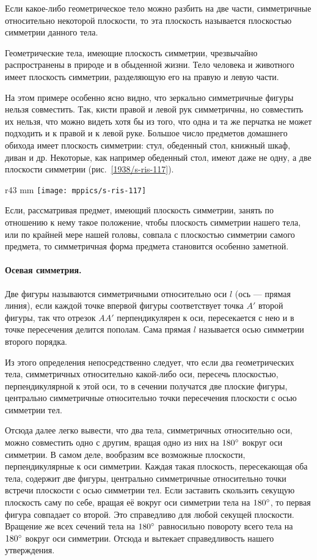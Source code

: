 Если какое-либо геометрическое тело можно разбить на две части, симметричные относительно некоторой плоскости, то эта плоскость называется плоскостью симметрии данного тела.

Геометрические тела, имеющие плоскость симметрии, чрезвычайно распространены в природе и в обыденной жизни.
Тело человека и животного имеет плоскость симметрии, разделяющую его на правую и левую части.

На этом примере особенно ясно видно, что зеркально симметричные фигуры нельзя совместить.
Так, кисти правой и левой рук симметричны, но совместить их нельзя, что можно видеть хотя бы из того, что одна и та же перчатка не может подходить и к правой и к левой руке.
Большое число предметов домашнего обихода имеет плоскость симметрии: стул, обеденный стол, книжный шкаф, диван и др.
Некоторые, как например обеденный стол, имеют даже не одну, а две плоскости симметрии (рис.~\ref{1938/s-ris-117}).

\begin{wrapfigure}{r}{43 mm}
\vskip-4mm
\centering
\texttt{[image: mppics/s-ris-117]}
\caption{}\label{1938/s-ris-117}
\vskip-0mm
\end{wrapfigure}

Если, рассматривая предмет, имеющий плоскость симметрии, занять по отношению к нему такое положение, чтобы плоскость симметрии нашего тела, или по крайней мере нашей головы, совпала с плоскостью симметрии самого предмета, то симметричная форма предмета становится особенно заметной.

\paragraph{Осевая симметрия.}\label{1938/s101}
Две фигуры называются симметричными относительно оси $l$ (ось — прямая линия), если каждой точке впервой фигуры соответствует точка $A'$ второй фигуры, так что отрезок $AA'$ перпендикулярен к оси, пересекается с нею и в точке пересечения делится пополам.
Сама прямая $l$ называется осью симметрии второго порядка.

Из этого определения непосредственно следует, что если два геометрических тела, симметричных относительно какой-либо оси, пересечь плоскостью, перпендикулярной к этой оси, то в сечении получатся две плоские фигуры, центрально симметричные относительно точки пересечения плоскости с осью симметрии тел.

Отсюда далее легко вывести, что два тела, симметричных относительно оси, можно совместить одно с другим, вращая одно из них на $180\degree$ вокруг оси симметрии.
В самом деле, вообразим все возможные плоскости, перпендикулярные к оси симметрии.
Каждая такая плоскость, пересекающая оба тела, содержит две фигуры, центрально симметричные относительно точки встречи плоскости с осью симметрии тел.
Если заставить скользить секущую плоскость саму по себе, вращая её вокруг оси симметрии тела на $180\degree$, то первая фигура совпадает со второй.
Это справедливо для любой секущей плоскости.
Вращение же всех сечений тела на $180\degree$ равносильно повороту всего тела на $180\degree$ вокруг оси симметрии.
Отсюда и вытекает справедливость нашего утверждения.

